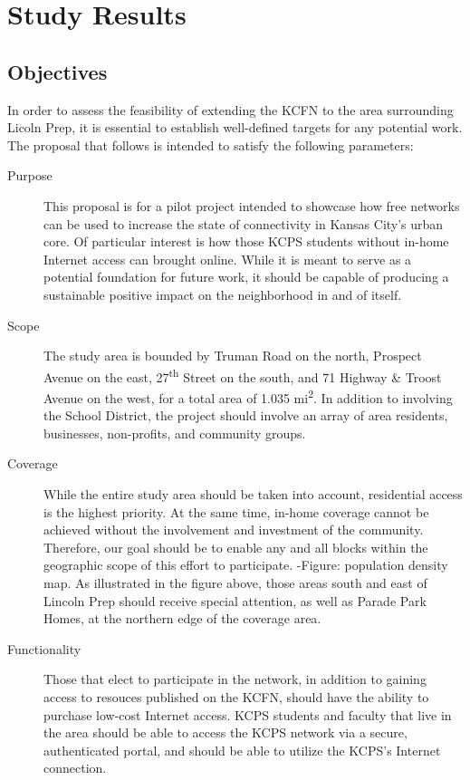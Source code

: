 \section{Study Results}\label{LPA}

\subsection{Objectives}
In order to assess the feasibility of extending the KCFN to the area surrounding
Licoln Prep, it is essential to establish well-defined targets for any potential
work. The proposal that follows is intended to satisfy the following parameters:

\begin{description}
\item[Purpose] This proposal is for a pilot project intended to showcase how
free networks can be used to increase the state of connectivity in Kansas City's
urban core. Of particular interest is how those KCPS students without in-home
Internet access can brought online. While it is meant to serve as a potential foundation for future work, it
should be capable of producing a sustainable positive impact on the
neighborhood in and of itself.

\item[Scope] The study area is bounded by Truman Road on the north, Prospect
Avenue on the east, 27\textsuperscript{th} Street on the south, and 71 Highway \& Troost
Avenue on the west, for a total area of 1.035 mi\textsuperscript{2}. In addition to involving
the School District, the project should involve an array of area residents,
businesses, non-profits, and community groups. 

\item[Coverage] While the entire study area should be taken into account,
residential access is the highest priority. At the same time, in-home coverage
cannot be achieved without the involvement and investment of the community.
Therefore, our goal should be to enable any and all blocks within
the geographic scope of this effort to participate.
-Figure: population density map.
As illustrated in the figure above, those areas south and east of Lincoln Prep
should receive special attention, as well as Parade Park Homes, at the northern
edge of the coverage area.

\item[Functionality] Those that elect to participate in the network, in addition
to gaining access to resouces published on the KCFN, should have the
ability to purchase low-cost Internet access. KCPS students and faculty that live in
the area should be able to access the KCPS network via a secure, authenticated portal,
and should be able to utilize the KCPS's Internet connection.


\end{description}
